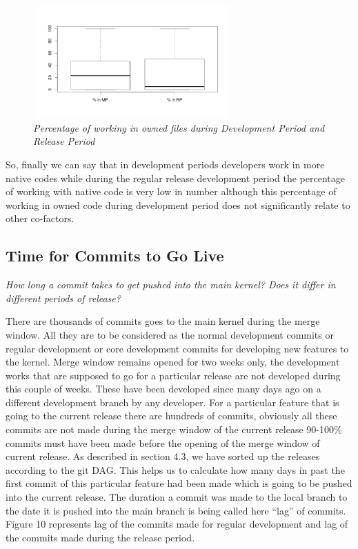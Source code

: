\documentclass{acm_proc_article-sp}
\begin{document}
\begin{figure}
\begin{center}
\includegraphics[height=1.7in,width=3in]{ownpMPRPbox.png}
\caption{\small \sl Percentage of working in owned files during Development Period and Release Period}
\end{center}
\end{figure}

So, finally we can say that in development periods developers work in more native codes while during the regular release development period the percentage of working with native code is very low in number although this percentage of working in owned code during development period does not significantly relate to other co-factors.

\subsection{Time for Commits to Go Live}
\textit{How long a commit takes to get pushed into the main kernel? Does it differ in different periods of release?}

There are thousands of commits goes to the main kernel during the merge window. All they are to be considered as the normal development commits or regular development or core development commits for developing new features to the kernel. Merge window remains opened for two weeks only, the development works that are supposed to go for a particular release are not developed during this couple of weeks. These have been developed since many days ago on a different development branch by any developer. For a particular feature that is going to the current release there are hundreds of commits, obviously all these commits are not made during the merge window of the current release 90-100\% commits must have been made before the opening of the merge window of current release. As described in section 4.3, we have sorted up the releases according to the git DAG. This helps us to calculate how many days in past the first commit of this particular feature had been made which is going to be pushed into the current release. The duration a commit was made to the local branch to the date it is pushed into the main branch is being called here ``lag'' of commits. Figure 10 represents lag of the commits made for regular development and lag of the commits made during the release period.
\end{document}
